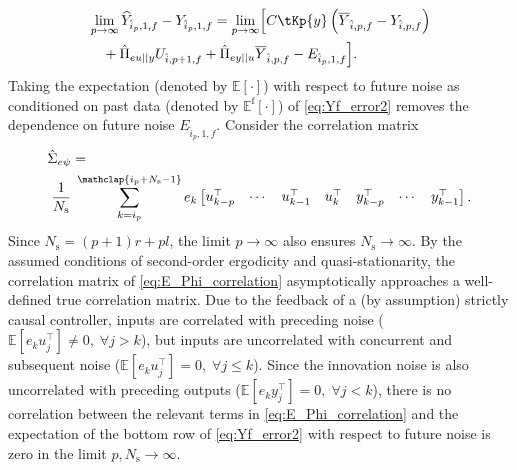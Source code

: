 \begin{alignat}{2}
\begin{split}\label{eq:Yf_error2}
    \!\!&\lim_{p\rightarrow\infty}\widehat{Y}_{\hat{i}_p,1,f}-Y_{\hat{i}_p,1,f} = \lim_{p\rightarrow\infty}\!\Big[C\tKp{y}\left(\overline{Y}_{\hat{i},p,f}-Y_{\hat{i},p,f}\right)\\
        &%
        \quad+\hat{\Pi}_{eu||y}U_{\hat{i},p+1,f}+\hat{\Pi}_{ey||u}\overline{Y}_{\hat{i},p,f}-E_{\hat{i}_p,1,f}\Big].
\end{split}
\end{alignat}%
Taking the expectation (denoted by $\mathbb{E}[\cdot]$) with respect to future noise as conditioned on past data (denoted by $\mathbb{E}^\mathrm{f}[\cdot]$) of \eqref{eq:Yf_error2} removes the dependence on future noise $E_{\hat{i}_p,1,f}$. Consider the correlation matrix
\begin{align}%
    \begin{split}
        &\hat{\Sigma}_{e\psi} = \\
        &\;\frac{1}{N_\mathrm{s}}\;\sum\limits_{k=i_p}^{\mathclap{i_p+N_\mathrm{s}-1}} e_k \begin{bmatrix}u_{k-p}^\top & \cdots & u_{k-1}^\top & u_k^\top & y_{k-p}^\top & \cdots & y_{k-1}^\top \end{bmatrix}.
    \end{split}
\end{align}
Since $N_\mathrm{s}=(p+1)r+pl$, the limit $p\rightarrow\infty$ also ensures $N_\mathrm{s}\rightarrow\infty$. By the assumed conditions of second-order ergodicity and quasi-stationarity, the correlation matrix of \eqref{eq:E_Phi_correlation} asymptotically approaches a well-defined true correlation matrix. Due to the feedback of a (by assumption) strictly causal controller, inputs are correlated with preceding noise (${\mathbb{E}[e_k u_j^\top]\neq0,\; \forall j>k}$), but inputs are uncorrelated with concurrent and subsequent noise (${\mathbb{E}[e_k u_j^\top]=0,\; \forall j\leq k}$). Since the innovation noise is also uncorrelated with preceding outputs (${\mathbb{E}[e_k y_j^\top]=0,\; \forall j<k}$), there is no correlation between the relevant terms in \eqref{eq:E_Phi_correlation} and the expectation of the bottom row of \eqref{eq:Yf_error2} with respect to future noise is zero in the limit $p,N_\mathrm{s}\rightarrow\infty$. %

